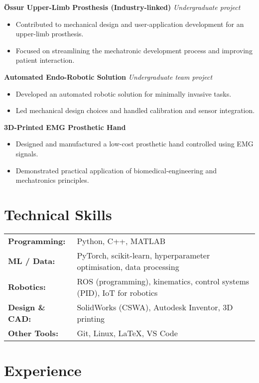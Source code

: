 \documentclass[a4paper,11pt]{article}
\begin{document}
\textbf{Össur Upper-Limb Prosthesis (Industry-linked)} \hfill \textit{Undergraduate project}
\begin{itemize}
    \item Contributed to mechanical design and user-application development for an upper-limb prosthesis.
    \item Focused on streamlining the mechatronic development process and improving patient interaction.
\end{itemize}

\textbf{Automated Endo-Robotic Solution} \hfill \textit{Undergraduate team project}
\begin{itemize}
    \item Developed an automated robotic solution for minimally invasive tasks.
    \item Led mechanical design choices and handled calibration and sensor integration.
\end{itemize}

\textbf{3D-Printed EMG Prosthetic Hand}
\begin{itemize}
    \item Designed and manufactured a low-cost prosthetic hand controlled using EMG signals.
    \item Demonstrated practical application of biomedical-engineering and mechatronics principles.
\end{itemize}


\section*{Technical Skills}

\begin{tabular}{@{}ll}
\textbf{Programming:} & Python, C++, MATLAB \\
\textbf{ML / Data:} & PyTorch, scikit-learn, hyperparameter optimisation, data processing \\
\textbf{Robotics:} & ROS (programming), kinematics, control systems (PID), IoT for robotics \\
\textbf{Design \& CAD:} & SolidWorks (CSWA), Autodesk Inventor, 3D printing \\
\textbf{Other Tools:} & Git, Linux, LaTeX, VS Code
\end{tabular}


\section*{Experience}
\end{document}

